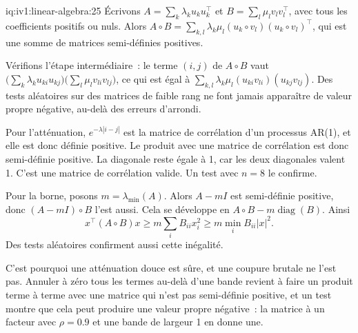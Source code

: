 \begin{solution}{iq:iv1:linear-algebra:25}
Écrivons $A = \sum_k \lambda_ku_ku_k^\top$ et $B = \sum_l \mu_lv_lv_l^\top$, avec tous les coefficients positifs ou nuls. Alors $A \circ B = \sum_{k, l}\lambda_k\mu_l(u_k \circ v_l)(u_k \circ v_l)^\top$, qui est une somme de matrices semi-définies positives.

Vérifions l'étape intermédiaire~: le terme $(i, j)$ de $A \circ B$ vaut $\bigl(\sum_k\lambda_ku_{ki}u_{kj}\bigr)\bigl(\sum_l\mu_lv_{li}v_{lj}\bigr)$, ce qui est égal à $\sum_{k, l}\lambda_k\mu_l(u_{ki}v_{li})(u_{kj}v_{lj})$. Des tests aléatoires sur des matrices de faible rang ne font jamais apparaître de valeur propre négative, au-delà des erreurs d'arrondi.

Pour l'atténuation, $e^{-\lambda|i - j|}$ est la matrice de corrélation d'un processus AR(1), et elle est donc définie positive. Le produit avec une matrice de corrélation est donc semi-définie positive. La diagonale reste égale à 1, car les deux diagonales valent 1. C'est une matrice de corrélation valide. Un test avec $n = 8$ le confirme.

Pour la borne, posons $m = \lambda_{\min}(A)$. Alors $A - mI$ est semi-définie positive, donc $(A - mI) \circ B$ l'est aussi. Cela se développe en $A \circ B - m\operatorname{diag}(B)$. Ainsi
\[
x^\top(A \circ B)x \ge m\sum_i B_{ii}x_i^2 \ge m\min_iB_{ii}|x|^2.
\]
Des tests aléatoires confirment aussi cette inégalité.

C'est pourquoi une atténuation douce est sûre, et une coupure brutale ne l'est pas. Annuler à zéro tous les termes au-delà d'une bande revient à faire un produit terme à terme avec une matrice qui n'est pas semi-définie positive, et un test montre que cela peut produire une valeur propre négative~: la matrice à un facteur avec $\rho = 0.9$ et une bande de largeur 1 en donne une.

\end{solution}
